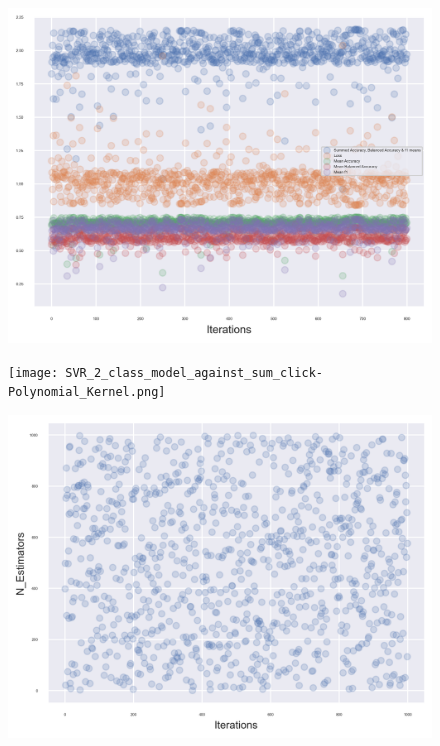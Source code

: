 \documentclass[11pt, a4paper, twocolumn]{article}
\begin{document}
\begin{figure}[h]
	\includegraphics[width=\linewidth]{Accuracy_against_iteration1.png} 
	\label{fig:Acc1}
\end{figure}
\centering
\begin{figure}[h]
	\texttt{[image: SVR\_2\_class\_model\_against\_sum\_click-Polynomial\_Kernel.png]} 
	\label{fig:PolyClicks}
\end{figure}
\centering
\begin{figure}[h]
	\includegraphics[width=\linewidth]{Estimators_against_iteration.png} 
	\label{fig:estimators}
\end{figure}
\centering
\end{document}
